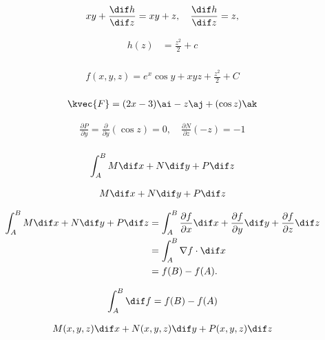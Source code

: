 \begin{align*}
xy+\frac{\dif h}{\dif z}&=xy+z,\quad \frac{\dif h}{\dif z}=z,\\
\end{align*}

\begin{align*}
h(z)&=\frac{z^{2}}{2}+c\\
\end{align*}

\begin{align*}
f(x,y,z)=e^{x}\cos y+xyz+\frac{z^{2}}{2}+C\\
\end{align*}

\begin{align*}
\kvec{F}=(2x-3)\ai-z\aj+(\cos z)\ak\\ 
\end{align*}

\begin{align*}
\frac{\partial{P}}{\partial{y}}=\frac{\partial}{\partial{y}}(\cos z)=0,\quad\frac{\partial{N}}{\partial{z}}(-z)=-1\\
\end{align*}

\begin{align*}
\int_{A}^{B}M\dif x+N\dif y+P\dif z\\
\end{align*}

\begin{align*}
M\dif x+N\dif y+P\dif z\\
\end{align*}

\begin{align*}
\int_{A}^{B}M\dif x+N\dif y+P\dif z&=\int_{A}^{B}\frac{\partial{f}}{\partial{x}}\dif x+\frac{\partial{f}}{\partial{y}}\dif y+\frac{\partial{f}}{\partial{z}}\dif z\\
&=\int_{A}^{B}\nabla f\cdot\dif x\\
&=f(B)-f(A).\\
\end{align*}

\begin{align*}
\int_{A}^{B}\dif f&=f(B)-f(A)\\
\end{align*}

\begin{align*}
M(x,y,z)\dif x+N(x,y,z)\dif y+P(x,y,z)\dif z\\
\end{align*}

